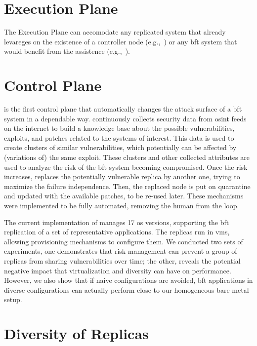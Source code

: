 \section{Execution Plane}
\label{sec:executionplane}

The Execution Plane can accomodate any replicated system that already levareges on the existence of a controller node (e.g.,~\cite{Sousa:2010,Roeder:2010,Platania:2014,Garcia:2016}) or any \gls{bft} system that would benefit from the \system assistence (e.g.,~\cite{Sousa:2018}). 


\section{Control Plane}
\label{sec:controlplane}

\system is the first control plane that automatically changes the attack surface of a \gls{bft} system in a dependable way.
\system continuously collects security data from \gls{osint} feeds on the internet to build a knowledge base about the possible vulnerabilities, exploits, and patches related to the systems of interest.
This data is used to create clusters of similar vulnerabilities, which potentially can be affected by (variations of) the same exploit.
These clusters and other collected attributes are used to analyze the risk of the \gls{bft} system becoming compromised. %
Once the risk increases, \system replaces the potentially vulnerable replica by another one, trying to maximize the failure independence. %
Then, the replaced node is put on quarantine and updated with the available patches, to be re-used later.
These mechanisms were implemented to be fully automated, removing the human from the loop.

The current implementation of \system manages 17 \gls{os} versions, supporting the \gls{bft} replication of a set of representative applications.
The replicas run in \glspl{vm}, allowing provisioning mechanisms to configure them. 
We conducted two sets of experiments, one demonstrates that \system risk management can prevent a group of replicas from sharing vulnerabilities over time; the other, reveals the potential negative impact that virtualization and diversity can have on performance. 
However, we also show that if naive configurations are avoided, \gls{bft} applications in diverse configurations can actually perform close to our homogeneous bare metal setup.

\section{Diversity of Replicas}
\label{sec:diversityofreplicas}

